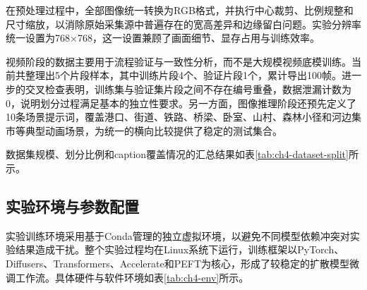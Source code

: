 在预处理过程中，全部图像统一转换为RGB格式，并执行中心裁剪、比例规整和尺寸缩放，以消除原始采集源中普遍存在的宽高差异和边缘留白问题。实验分辨率统一设置为768×768，这一设置兼顾了画面细节、显存占用与训练效率。

视频阶段的数据主要用于流程验证与一致性分析，而不是大规模视频底模训练。当前共整理出5个片段样本，其中训练片段4个、验证片段1个，累计导出100帧。进一步的交叉检查表明，训练集与验证集片段之间不存在编号重叠，数据泄漏计数为0，说明划分过程满足基本的独立性要求。另一方面，图像推理阶段还预先定义了10条场景提示词，覆盖港口、街道、铁路、桥梁、卧室、山村、森林小径和河边集市等典型动画场景，为统一的横向比较提供了稳定的测试集合。

数据集规模、划分比例和caption覆盖情况的汇总结果如表\ref{tab:ch4-dataset-split}所示。

\begin{table}[htbp]
  \centering
  \caption{数据集预处理与划分结果}
  \label{tab:ch4-dataset-split}
\end{table}

\subsection{实验环境与参数配置}

实验训练环境采用基于Conda管理的独立虚拟环境，以避免不同模型依赖冲突对实验结果造成干扰。整个实验过程均在Linux系统下运行，训练框架以PyTorch、Diffusers、Transformers、Accelerate和PEFT为核心，形成了较稳定的扩散模型微调工作流。具体硬件与软件环境如表\ref{tab:ch4-env}所示。

